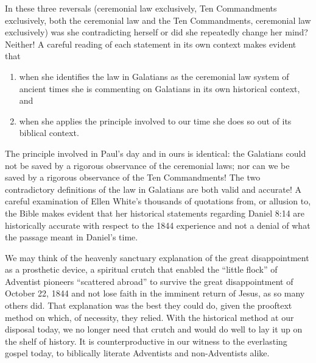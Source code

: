 In these three reversals (ceremonial law exclusively, Ten Commandments
exclusively, both the ceremonial law and the Ten Commandments, ceremonial
law exclusively) was she contradicting herself or did she repeatedly change
her mind? Neither! A careful reading of each statement in its own context
makes evident that
\begin{enumerate}
        \item when she identifies the law in Galatians as the
ceremonial law system of ancient times she is commenting on Galatians in its
own historical context, and 
        \item when she applies the principle involved to
our time she does so out of its biblical context.
\end{enumerate}
The principle involved in
Paul's day and in ours is identical: the Galatians could not be saved by a
rigorous observance of the ceremonial laws; nor can we be saved by a
rigorous observance of the Ten Commandments! The two contradictory
definitions of the law in Galatians are both valid and accurate! A careful
examination of Ellen White's thousands of quotations from, or allusion to,
the Bible makes evident that her historical statements regarding Daniel 8:14
are historically accurate with respect to the 1844 experience and not a
denial of what the passage meant in Daniel's time. 

We may think of the heavenly sanctuary explanation of the great
disappointment as a prosthetic device, a spiritual crutch that enabled the
``little flock'' of Adventist pioneers ``scattered abroad'' to survive the
great disappointment of October 22, 1844 and not lose faith in the imminent
return of Jesus, as so many others did. That explanation was the best they
could do, given the prooftext method on which, of necessity, they relied.
With the historical method at our disposal today, we no longer need that
crutch and would do well to lay it up on the shelf of history. It is
counterproductive in our witness to the everlasting gospel today, to
biblically literate Adventists and non-Adventists alike. 
